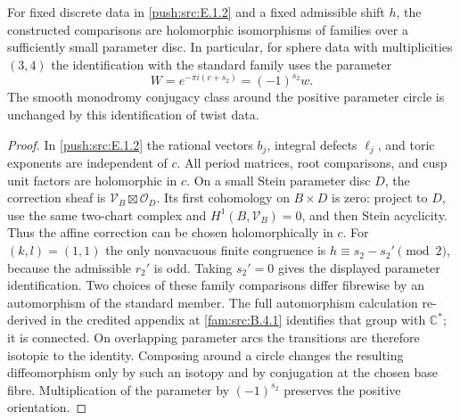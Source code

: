 \begin{corollary}\label{push:src:E.1.3}
For fixed discrete data in \ref{push:src:E.1.2} and a fixed admissible shift $h$,
the constructed comparisons are holomorphic isomorphisms of families
over a sufficiently small parameter disc.  In particular, for sphere
data with multiplicities $(3,4)$ the identification with the standard
family uses the parameter
\[
 W=e^{-\pi i(c+s_2)}=(-1)^{s_2}w.
\]
The smooth monodromy conjugacy class around the positive parameter
circle is unchanged by this identification of twist data.
\end{corollary}

\begin{proof}
In \ref{push:src:E.1.2} the rational vectors $b_j$, integral defects $\ell_j$,
and toric exponents are independent of $c$.  All period matrices,
root comparisons, and cusp unit factors are holomorphic in $c$.
On a small Stein parameter disc $D$, the correction sheaf is
$\mathcal V_B\boxtimes\mathcal O_D$.  Its first cohomology on
$B\times D$ is zero: project to $D$, use the same two-chart
complex and $H^1(B,\mathcal V_B)=0$, and then Stein acyclicity.
Thus the affine correction can be chosen holomorphically in $c$.
For $(k,l)=(1,1)$ the only nonvacuous finite congruence is
$h\equiv s_2-s_2'\pmod2$, because the admissible $r_2'$ is odd.
Taking $s_2'=0$ gives the displayed parameter identification.
Two choices of these family comparisons differ fibrewise by an
automorphism of the standard member.  The full automorphism
calculation re-derived in the credited appendix at \ref{fam:src:B.4.1} identifies that group with $\mathbb C^*$;
it is connected.  On overlapping parameter arcs the transitions
are therefore isotopic to the identity.  Composing around a circle
changes the resulting diffeomorphism only by such an isotopy and
by conjugation at the chosen base fibre.  Multiplication of the
parameter by $(-1)^{s_2}$ preserves the positive orientation.
\end{proof}
